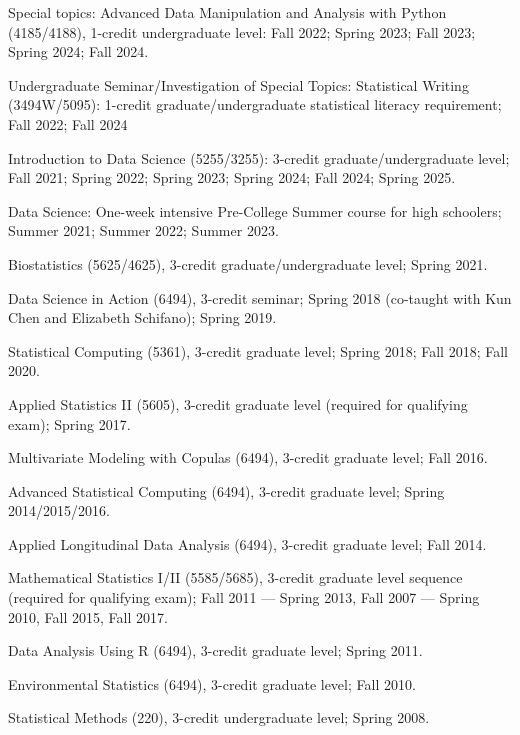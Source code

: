\documentclass[Statistics]{vita}
\begin{document}
\begin{vita}
\begin{Services}
\begin{Media}
  \end{Media}
\end{Services}
  \begin{TeachingExperience}
    \begin{UConn}
    \item Special topics: Advanced Data Manipulation and Analysis with Python (4185/4188), 1-credit undergraduate level: Fall 2022; Spring 2023; Fall 2023; Spring 2024; Fall 2024.
    \item Undergraduate Seminar/Investigation of Special Topics: Statistical Writing (3494W/5095): 1-credit graduate/undergraduate statistical literacy requirement; Fall 2022; Fall 2024
    \item Introduction to Data Science (5255/3255): 3-credit graduate/undergraduate level; Fall 2021; Spring 2022; Spring 2023; Spring 2024; Fall 2024; Spring 2025.
    \item Data Science: One-week intensive Pre-College Summer course for high schoolers; Summer 2021; Summer 2022; Summer 2023.
    \item Biostatistics (5625/4625), 3-credit graduate/undergraduate level; Spring 2021.
    \item Data Science in Action (6494), 3-credit seminar; Spring 2018 (co-taught with Kun Chen and Elizabeth Schifano); Spring 2019.
    \item Statistical Computing (5361), 3-credit graduate level; Spring 2018; Fall 2018; Fall 2020.
    \item Applied Statistics II (5605), 3-credit graduate level (required for qualifying exam); Spring 2017.
    \item Multivariate Modeling with Copulas (6494), 3-credit graduate level; Fall 2016.
    \item Advanced Statistical Computing (6494), 3-credit graduate level; Spring 2014/2015/2016.
    \item Applied Longitudinal Data Analysis (6494), 3-credit graduate level; Fall 2014.
    \item Mathematical Statistics I/II (5585/5685), 3-credit graduate level sequence (required for qualifying exam); Fall 2011 --- Spring 2013, Fall 2007 --- Spring 2010, Fall 2015, Fall 2017.
    \item Data Analysis Using R (6494), 3-credit graduate level; Spring 2011.
    \item Environmental Statistics (6494), 3-credit graduate level; Fall 2010.
    \item Statistical Methods (220), 3-credit undergraduate level; Spring 2008.

\end{UConn}
\end{TeachingExperience}
\end{vita}
\end{document}
